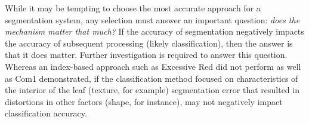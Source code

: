 \documentclass[agriculture,article,submit,pdftex,moreauthors]{Definitions/mdpi}
\begin{document}
While it may be tempting to choose the most accurate approach for a segmentation system, any selection must answer an important question: \textit{does the mechanism matter that much?} If the accuracy of segmentation negatively impacts the accuracy of subsequent processing (likely classification), then the answer is that it does matter. Further investigation is required to answer this question. Whereas an index-based approach such as Excessive Red did not perform as well as Com1 demonstrated, if the classification method focused on characteristics of the interior of the leaf (texture, for example) segmentation error that resulted in distortions in other factors (shape, for instance), may not negatively impact classification accuracy.


%
%
%
%
%
%
%
\end{document}
